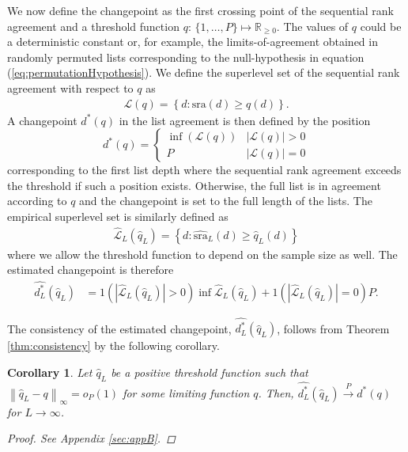\documentclass[12pt,a4paper]{article}
\theoremstyle{plain}
\newtheorem{corollary}{Corollary}
\begin{document}
We now define the changepoint as the first crossing point of the
sequential rank agreement and a threshold function
$q\colon\,\{1,\ldots,P\} \mapsto \mathbb{R}_{\geq 0}$. The values of
$q$ could be a deterministic constant or, %
for example, the limits-of-agreement obtained in randomly permuted
lists corresponding to the null-hypothesis in equation
(\ref{eq:permutationHypothesis}). We define the superlevel set of the
sequential rank agreement with respect to $q$ as
\begin{align}
  \mathcal{L}(q) = \left\{d : \textrm{sra}(d) \geq q(d)\right\}.
\end{align}
A changepoint $d^\ast(q)$ in the list agreement is then defined by the position
\begin{equation}
  d^\ast(q) =
  \begin{cases}
    \inf(\mathcal{L}(q)) & |\mathcal{L}(q)| > 0\\
  P & |\mathcal{L}(q)| = 0
  \end{cases}
\end{equation}
corresponding to the first list depth where the sequential rank
agreement exceeds the threshold if such a position exists. Otherwise,
the full list is in agreement according to $q$ and the changepoint is
set to the full length of the lists. The empirical superlevel set is
similarly defined as
\begin{align}
 \widehat{\mathcal{L}}_L(\widehat{q}_L) = \left\{d : \widehat{\textrm{sra}}_L(d) \geq \widehat{q}_L(d)\right\}
\end{align}
where we allow the threshold function to depend on the sample size as
well. The estimated changepoint is therefore
\begin{align}
  \widehat{d^\ast_L}(\widehat{q}_L) &= 1(|\widehat{\mathcal{L}}_L(\widehat{q}_L)| > 0)\inf \widehat{\mathcal{L}}_L(\widehat{q}_L) + 1(|\widehat{\mathcal{L}}_L(\widehat{q}_L)| = 0)P.
\end{align}

The consistency of the estimated changepoint, $\widehat{d^\ast_L}(\widehat{q}_L)$, follows from Theorem \ref{thm:consistency} by the following corollary. 
\begin{corollary}\label{thecor}
Let $\widehat{q}_L$ be a positive threshold function such that $\left\|\widehat{q}_L - q\right\|_\infty = o_P(1)$ for some limiting
function $q$.  Then, $\widehat{d^\ast_L}(\widehat{q}_L) \overset{P}{\longrightarrow} d^\ast(q)$ for $L \rightarrow \infty$.
\label{cor:consistency}
\begin{proof}
See Appendix \ref{sec:appB}.
\end{proof}
\end{corollary}
\end{document}
